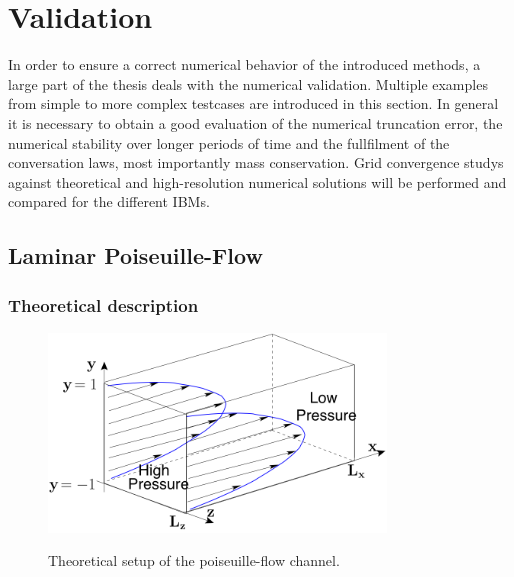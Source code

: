 \section{Validation}

In order to ensure a correct numerical behavior of the introduced methods, a large part of
the thesis deals with the numerical validation.
Multiple examples from simple to more complex testcases are introduced in this section.
In general it is necessary to obtain a good evaluation of the numerical truncation error,
 the numerical stability over longer periods of time
and the fullfilment of the conversation laws, most importantly mass conservation.
Grid convergence studys against theoretical and high-resolution numerical solutions
will be performed and compared for the different IBMs.


\subsection{Laminar Poiseuille-Flow}
\subsubsection{Theoretical description}

\begin{figure}[!bp]
  \centering
  \includegraphics[width=0.8\textwidth]{gfx/immersed_boundary/val_volpen/poiseuilleflow.png}\label{b}
  \caption{Theoretical setup of the poiseuille-flow channel.}
\end{figure}



